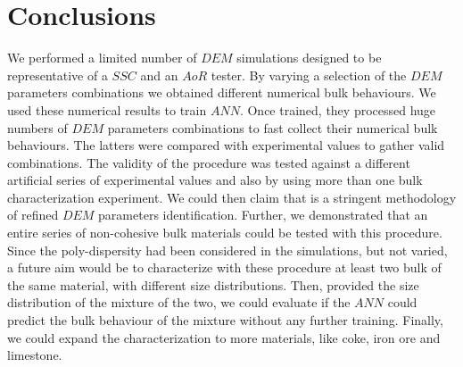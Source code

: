 \section{Conclusions}
\label{sec:conclusions}
We performed a 
limited number of $DEM$ simulations designed to be representative of a $SSC$ and an $AoR$ tester. 
By varying a selection of the $DEM$ parameters combinations we obtained different numerical bulk behaviours. 
We used these numerical results to train $ANN$. Once trained, they processed huge 
numbers of $DEM$ parameters combinations to fast collect their numerical bulk behaviours. 
The latters were compared with experimental values to gather valid combinations. 
The validity of the procedure was tested against a different artificial series of experimental 
values and also by using more than one bulk characterization experiment. 
We could then claim that is a stringent methodology of refined $DEM$ parameters identification. 
Further, we demonstrated that an entire series of non-cohesive bulk materials could be tested with this procedure.
Since the poly-dispersity had been considered in the simulations, but not varied, a future aim would 
be to characterize with these procedure at least two bulk of the same material, with different size distributions. 
Then, provided the size distribution of the mixture of the two, we could evaluate if the $ANN$ could predict 
the bulk behaviour of the mixture without any further training. 
Finally, we could expand the characterization to more materials, like coke, iron
ore and limestone.

